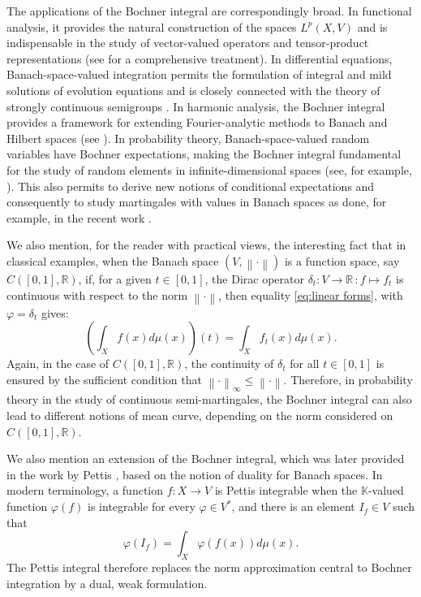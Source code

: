 \documentclass{amsart}
\theoremstyle{definition}
\theoremstyle{plain}
\newcommand{\K}{\mathbb{K}}
\newcommand{\R}{\mathbb{R}}
\newcommand{\norm}[1]{\left\lVert #1\right\rVert} %
\begin{document}
        The applications of the Bochner integral are correspondingly broad. 
        In functional analysis, it provides the natural construction of the spaces $L^p(X,V)$ and is indispensable in the study of vector-valued operators and tensor-product representations (see \cite{Raymond2002} for a comprehensive treatment). 
        In differential equations, Banach-space-valued integration permits the formulation of integral and mild solutions of evolution equations and is closely connected with the theory of strongly continuous semigroups \cite{Hille/Phillips1957}. 
        In harmonic analysis, the Bochner integral provides a framework for extending Fourier-analytic methods to Banach and Hilbert spaces (see \cite{Hytoenen/van_Neerven/Veraar/Weis2016}).
        In probability theory, Banach-space-valued random variables have Bochner expectations, making the Bochner integral fundamental for the study of random elements in infinite-dimensional spaces (see, for example, \cite{Chatterji1968}). 
        This also permits to derive new notions of conditional expectations and consequently to study martingales with values in Banach spaces as done, for example, in the recent work \cite{steinwart2024conditioning}.

        We also mention, for the reader with practical views, the interesting fact that in classical examples, when the Banach space $(V,\norm{\cdot})$ is a function space, say $C([0,1],\R)$, if, for a given $t \in[0,1]$, the Dirac operator $\delta_t \colon V \rightarrow \R \, \colon f \mapsto f_t$ is continuous with respect to the norm $\norm{\cdot}$, then equality \eqref{eq:linear forms}, with $\varphi = \delta_t$ gives:
        \begin{equation*}
            \left( \int_X f(x) d\mu(x) \right)(t) = \int_X  f_t (x) d\mu(x).
        \end{equation*}
        Again, in the case of $C([0,1],\R)$, the continuity of $\delta_t$ for all $t \in [0,1]$ is ensured by the sufficient condition that $\norm{\cdot}_\infty \leq \norm{\cdot}$.
        Therefore, in probability theory in the study of continuous semi-martingales, the Bochner integral can also lead to different notions of mean curve, depending on the norm considered on $C([0,1],\R)$.
        
        We also mention an extension of the Bochner integral, which was later provided in the work by Pettis \cite{Pettis1938}, based on the notion of duality for Banach spaces. 
        In modern terminology, a function $f \colon X \rightarrow V$ is Pettis integrable when the $\K$-valued function $\varphi(f)$ is integrable for every $\varphi \in V^*$, and there is an element $I_f \in V$ such that
        \begin{equation*}
            \varphi(I_f) = \int_X \varphi\left( f(x) \right) d\mu(x).
        \end{equation*}
        The Pettis integral therefore replaces the norm approximation central to Bochner integration by a dual, weak formulation.
\end{document}
